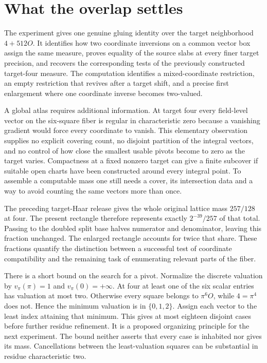 \documentclass[12pt,letterpaper]{article}
\begin{document}
\section{What the overlap settles}
The experiment gives one genuine gluing identity over the target neighborhood $4+512O$. It identifies how two coordinate inversions on a common vector box assign the same measure, proves equality of the source slabs at every finer target precision, and recovers the corresponding tests of the previously constructed target-four measure. The computation identifies a mixed-coordinate restriction, an empty restriction that revives after a target shift, and a precise first enlargement where one coordinate inverse becomes two-valued.

A global atlas requires additional information. At target four every field-level vector on the six-square fiber is regular in characteristic zero because a vanishing gradient would force every coordinate to vanish. This elementary observation supplies no explicit covering count, no disjoint partition of the integral vectors, and no control of how close the smallest usable pivots become to zero as the target varies. Compactness at a fixed nonzero target can give a finite subcover if suitable open charts have been constructed around every integral point. To assemble a computable mass one still needs a cover, its intersection data and a way to avoid counting the same vectors more than once.

The preceding target-Haar release gives the whole original lattice mass $257/128$ at four. The present rectangle therefore represents exactly $2^{-39}/257$ of that total. Passing to the doubled split base halves numerator and denominator, leaving this fraction unchanged. The enlarged rectangle accounts for twice that share. These fractions quantify the distinction between a successful test of coordinate compatibility and the remaining task of enumerating relevant parts of the fiber.

There is a short bound on the search for a pivot. Normalize the discrete valuation by $v_\pi(\pi)=1$ and $v_\pi(0)=+\infty$. At four at least one of the six scalar entries has valuation at most two. Otherwise every square belongs to $\pi^6O$, while $4=\pi^4$ does not. Hence the minimum valuation is in $\{0,1,2\}$. Assign each vector to the least index attaining that minimum. This gives at most eighteen disjoint cases before further residue refinement. It is a proposed organizing principle for the next experiment. The bound neither asserts that every case is inhabited nor gives its mass. Cancellations between the least-valuation squares can be substantial in residue characteristic two.
\end{document}
